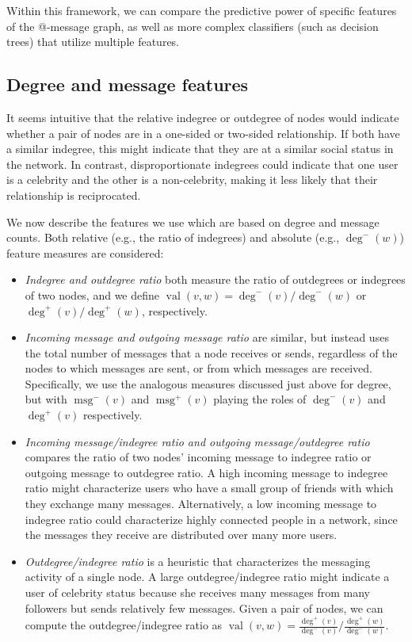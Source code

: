 \documentclass[conference]{IEEEtran}
\begin{document}
Within this framework, we can compare the predictive power of specific features of the @-message graph, as well as more complex classifiers (such as decision trees) that utilize multiple features.

\subsection{Degree and message features}
It seems intuitive that the relative indegree or outdegree of nodes would indicate whether a pair of nodes are in a one-sided or two-sided relationship. 
If both have a similar indegree, this might indicate that they are at a similar social status in the network. 
In contrast, disproportionate indegrees could indicate that one user is a celebrity and the other is a non-celebrity, making it less likely that their relationship is reciprocated.

We now describe the features we use which are based on degree and message counts.  
Both relative (e.g., the ratio of indegrees) and absolute (e.g., $\deg^-(w)$) feature measures are considered:

\begin{itemize}
\item \emph{Indegree and outdegree ratio} both measure the ratio of outdegrees or indegrees of two nodes, and we define $\operatorname{val}(v,w) = \deg^-(v)/\deg^-(w)$ or $\deg^+(v)/\deg^+(w)$, respectively.

\item \emph{Incoming message and outgoing message ratio} are similar,
but instead uses the total number of messages that a node receives or
sends, regardless of the nodes to which messages are sent, or from which messages are received.
Specifically, we use the analogous measures
discussed just above for degree, but with 
$\operatorname{msg}^-(v)$ and $\operatorname{msg}^+(v)$ playing
the roles of $\deg^-(v)$ and $\deg^+(v)$ respectively.

\item \emph{Incoming message/indegree ratio and outgoing message/outdegree ratio} compares the ratio of two nodes' incoming message to indegree ratio or outgoing message to outdegree ratio. 
A high incoming message to indegree ratio might characterize users who have a small group of friends with which they exchange many messages.
Alternatively, a low incoming message to indegree ratio could characterize highly connected 
people in a network, since the messages they receive are distributed over many more users.

\item \emph{Outdegree/indegree ratio} is a heuristic that characterizes the messaging activity of a single node.  
A large outdegree/indegree ratio might indicate a user of celebrity status because she receives many messages from many followers  
but sends relatively few messages. 
Given a pair of nodes, we can compute the outdegree/indegree ratio as $\operatorname{val}(v,w) = \frac{\deg^+(v)}{\deg^-(v)} / \frac{\deg^+(w)}{\deg^-(w)}$.
\end{itemize}
\end{document}
